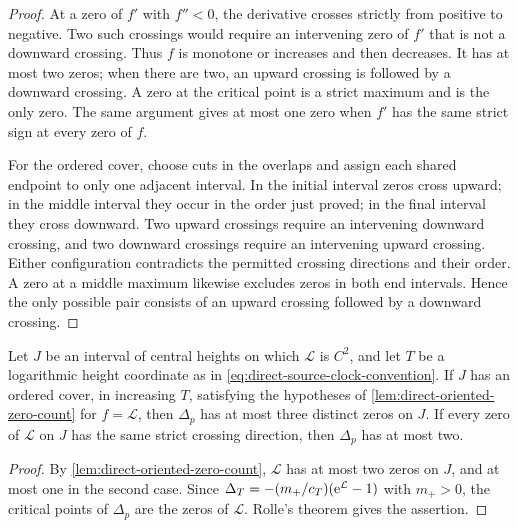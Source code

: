 \begin{proof}
At a zero of \(f'\) with \(f''<0\), the derivative crosses
strictly from positive to negative. Two such crossings would require
an intervening zero of \(f'\) that is not a downward crossing.
Thus \(f\) is monotone or increases and then decreases. It has at
most two zeros; when there are two, an upward crossing is followed by
a downward crossing. A zero at the critical point is a strict maximum
and is the only zero. The same argument gives at most one zero when
\(f'\) has the same strict sign at every zero of \(f\).

For the ordered cover, choose cuts in the overlaps and assign each
shared endpoint to only one adjacent interval. In the initial interval
zeros cross upward; in the middle interval they occur in the order
just proved; in the final interval they cross downward. Two upward
crossings require an intervening downward crossing, and two downward
crossings require an intervening upward crossing. Either configuration
contradicts the permitted crossing directions and their order. A zero
at a middle maximum likewise excludes zeros in both end intervals.
Hence the only possible pair consists of an upward crossing followed
by a downward crossing.
\end{proof}

\begin{samepage}
\begin{corollary}
\label{cor:ordered-cover-zero-count}
Let \(J\) be an interval of central heights on which \(\mathcal L\) is
\(C^2\), and let \(T\) be a logarithmic height coordinate as in
\eqref{eq:direct-source-clock-convention}. If \(J\) has an ordered cover,
in increasing \(T\), satisfying the hypotheses of
\cref{lem:direct-oriented-zero-count} for \(f=\mathcal L\), then
\(\Delta_p\) has at most three distinct zeros on \(J\). If every zero of
\(\mathcal L\) on \(J\) has the same strict crossing direction, then
\(\Delta_p\) has at most two.
\end{corollary}
\end{samepage}

\begin{proof}
By \cref{lem:direct-oriented-zero-count}, \(\mathcal L\) has at most two
zeros on \(J\), and at most one in the second case. Since
\(\Delta_T=-(m_+/c_T)(\mathrm e^{\mathcal L}-1)\) with \(m_+>0\), the critical
points of \(\Delta_p\) are the zeros of \(\mathcal L\). Rolle's theorem
gives the assertion.
\end{proof}


